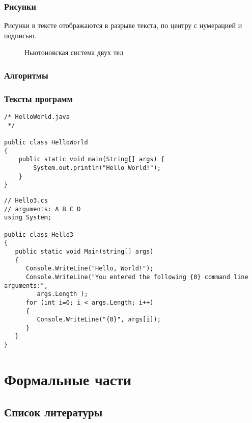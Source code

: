 \documentclass[a4paper,14pt,final]{extreport}
\begin{document}
\subsection{Рисунки}
\label{sec:figures}

Рисунки в тексте отображаются в разрыве текста, по центру с нумерацией и подписью.
\begin{figure}[bh]
  \centering
  \def\svgwidth{0.8\linewidth}
  


  \caption{Ньютоновская система двух тел}
  \label{fig:bodies}
\end{figure}


\subsection{Алгоритмы}
\label{sec:algs}

\subsection{Тексты программ}
\label{sec:sources}

\begin{verbatim}
/* HelloWorld.java
 */

public class HelloWorld
{
	public static void main(String[] args) {
		System.out.println("Hello World!");
	}
}
\end{verbatim}

\begin{verbatim}
// Hello3.cs
// arguments: A B C D
using System;

public class Hello3
{
   public static void Main(string[] args)
   {
      Console.WriteLine("Hello, World!");
      Console.WriteLine("You entered the following {0} command line arguments:",
         args.Length );
      for (int i=0; i < args.Length; i++)
      {
         Console.WriteLine("{0}", args[i]);
      }
   }
}
\end{verbatim}

\chapter{Формальные части}
\label{cha:formal}

\section{Список литературы}
\label{sec:refs}
\end{document}

